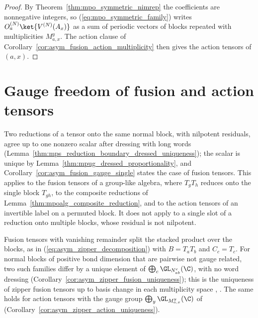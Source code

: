 \begin{proof}
    \leanok
    By Theorem~\ref{thm:mpo_symmetric_nimrep} the coefficients are
    nonnegative integers, so (\ref{eq:mpo_symmetric_family}) writes
    $O_a^{(N)}\ket{V^{(N)}(A_x)}$ as a sum of periodic vectors of blocks
    repeated with multiplicities $M_{a,x}^y$. The action clause of
    Corollary~\ref{cor:asym_fusion_action_multiplicity} then gives the
    action tensors of $(a,x)$.
\end{proof}

\section{Gauge freedom of fusion and action tensors}%
\label{sec:mpoalg_gauge}

Two reductions of a tensor onto the same normal block, with nilpotent
residuals, agree up to one nonzero scalar after dressing with long words
(Lemma~\ref{thm:mps_reduction_boundary_dressed_uniqueness}); the scalar is
unique by Lemma~\ref{thm:mpug_dressed_proportionality}, and
Corollary~\ref{cor:asym_fusion_gauge_single} states the case of fusion
tensors. This applies to the fusion tensors of a group-like algebra, where
$T_gT_h$ reduces onto the single block $T_{gh}$, to the composite reductions
of Lemma~\ref{thm:mpoalg_composite_reduction}, and to the action tensors of an
invertible label on a permuted block. It does not apply to a single slot of a
reduction onto multiple blocks, whose residual is not nilpotent.

Fusion tensors with vanishing remainder split the stacked product over the
blocks, as in (\ref{eq:asym_zipper_decomposition}) with $B=T_aT_b$ and
$C_c=T_c$. For normal blocks of positive bond dimension that are pairwise not
gauge related, two such families differ by a unique element of
$\bigoplus_c\GL_{N_{ab}^c}(\C)$, with no word dressing
(Corollary~\ref{cor:asym_zipper_fusion_uniqueness}); this is the uniqueness
of zipper fusion tensors up to basis change in each multiplicity space
\cite{Bultinck2017Anyons}, \cite[Section~4]{Molnar2022MPOAlgebrasI}. The same
holds for action tensors with the gauge group $\bigoplus_y\GL_{M_{a,x}^y}(\C)$
of \cite[Section~3.1]{GarreRubio2023MPOSym}
(Corollary~\ref{cor:asym_zipper_action_uniqueness}).

